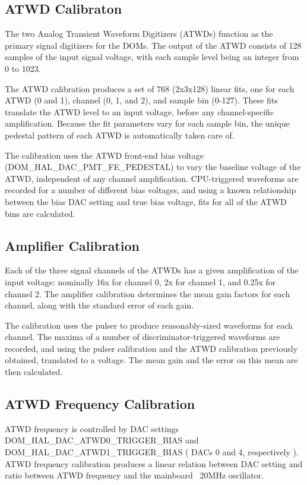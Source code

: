 \documentclass[10pt]{article}
\begin{document}
\subsection{ATWD Calibraton}

The two Analog Transient Waveform Digitizers (ATWDs) function as the
primary signal digitizers for the DOMs.  The output of the ATWD consists of
128 samples of the input signal voltage, with each sample level being an
integer from 0 to 1023.  

The ATWD calibration produces a set of 768 (2x3x128) linear fits, one for
each ATWD (0 and 1), channel (0, 1, and 2), and sample bin (0-127).  These
fits translate the ATWD level to an input voltage, before any
channel-specific amplification.  Because the fit parameters vary for each
sample bin, the unique pedestal pattern of each ATWD is automatically taken
care of.  

The calibration uses the ATWD front-end bias voltage
(DOM\_HAL\_DAC\_PMT\_FE\_PEDESTAL) to vary the baseline voltage of the
ATWD, independent of any channel amplification.  CPU-triggered waveforms
are recorded for a number of different bias voltages, and using a known
relationship between the bias DAC setting and true bias voltage, fits for all
of the ATWD bins are calculated.

\subsection{Amplifier Calibration}

Each of the three signal channels of the ATWDs has a given amplification of
the input voltage: nominally 16x for channel 0, 2x for channel 1, and 0.25x
for channel 2.  The amplifier calibration determines the mean gain factors
for each channel, along with the standard error of each gain.

The calibration uses the pulser to produce reasonably-sized waveforms for
each channel.  The maxima of a number of discriminator-triggered waveforms
are recorded, and using the pulser calibration and the ATWD calibration
previously obtained, translated to a voltage.  The mean gain and the error
on this mean are then calculated.

\subsection{ATWD Frequency Calibration}

ATWD frequency is controlled by DAC settings DOM\_HAL\_DAC\_ATWD0\_TRIGGER\_BIAS and
DOM\_HAL\_DAC\_ATWD1\_TRIGGER\_BIAS ( DACs 0 and 4, respectively ).  ATWD frequency
calibration produces a linear relation between DAC setting and ratio between ATWD
frequency and the mainboard ~20MHz oscillator.
\end{document}
